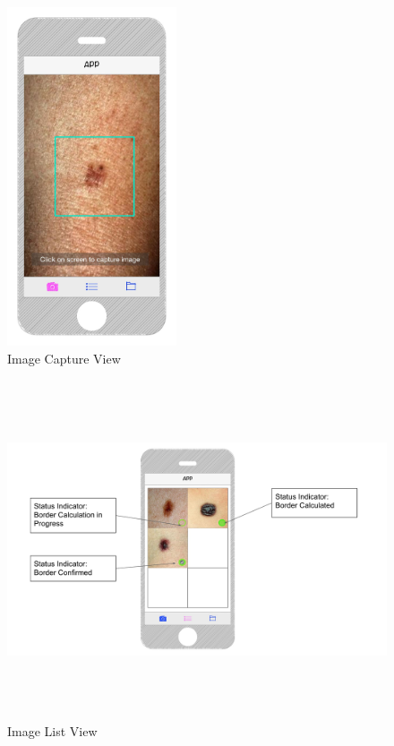\begin{figure}[H]
\centering
    \includegraphics[height=10cm,keepaspectratio]{assets/GUI/image_capture.pdf}
    \caption{Image Capture View}
    \label{fig:image_capture}
\end{figure}

\begin{figure}[H]
    \centering
    \includegraphics[height=10cm,keepaspectratio]{assets/GUI/image_list_view.pdf}
    \caption{Image List View}
    \label{fig:image_list_view}
\end{figure}

